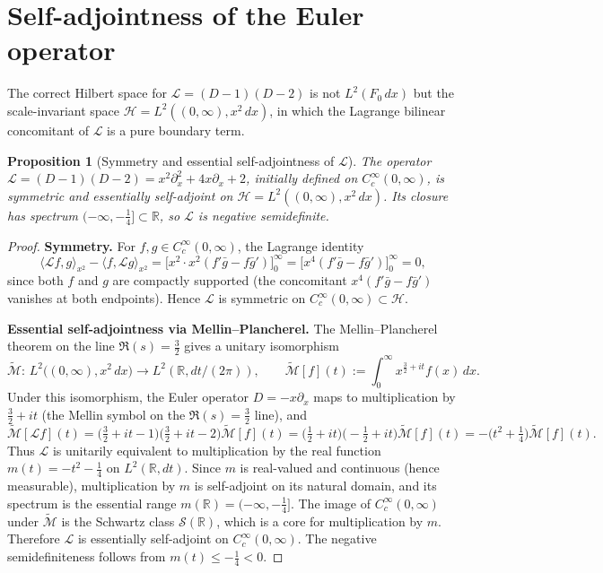 \documentclass[12pt]{article}
\theoremstyle{plain}
\newtheorem{proposition}[theorem]{Proposition}
\theoremstyle{definition}
\newcommand{\R}{\mathbb{R}}
\begin{document}
\section{Self-adjointness of the Euler operator}

The correct Hilbert space for $\mathcal{L}=(D-1)(D-2)$ is not $L^2(F_0\,dx)$
but the scale-invariant space $\mathcal{H}=L^2((0,\infty),x^2\,dx)$, in which
the Lagrange bilinear concomitant of $\mathcal{L}$ is a pure boundary term.

\begin{proposition}[Symmetry and essential self-adjointness of $\mathcal{L}$]
\label{prop:selfadj_L}
The operator $\mathcal{L}=(D-1)(D-2)=x^2\partial_x^2+4x\partial_x+2$,
initially defined on $C_c^\infty(0,\infty)$, is symmetric and essentially
self-adjoint on $\mathcal{H}=L^2((0,\infty),x^2\,dx)$.
Its closure has spectrum $(-\infty,-\tfrac14]\subset\R$, so $\mathcal{L}$
is negative semidefinite.
\end{proposition}

\begin{proof}
\textbf{Symmetry.}
For $f,g\in C_c^\infty(0,\infty)$, the Lagrange identity
\[
  \langle\mathcal{L}f,g\rangle_{x^2}-\langle f,\mathcal{L}g\rangle_{x^2}
  = \bigl[x^2\cdot x^2(f'\bar g-f\bar g')\bigr]_0^\infty
  = \bigl[x^4(f'\bar g-f\bar g')\bigr]_0^\infty = 0,
\]
since both $f$ and $g$ are compactly supported (the concomitant $x^4(f'\bar g-f\bar g')$
vanishes at both endpoints).  Hence $\mathcal{L}$ is symmetric on
$C_c^\infty(0,\infty)\subset\mathcal{H}$.

\textbf{Essential self-adjointness via Mellin--Plancherel.}
The Mellin--Plancherel theorem on the line $\Re(s)=\tfrac32$ gives a unitary
isomorphism
\[
  \widetilde{\mathcal{M}}:\,L^2\!\bigl((0,\infty),x^2\,dx\bigr)\longrightarrow
  L^2(\R,dt/(2\pi)),
  \qquad
  \widetilde{\mathcal{M}}[f](t):=\int_0^\infty x^{\frac32+it}f(x)\,dx.
\]
Under this isomorphism, the Euler operator $D=-x\partial_x$ maps to multiplication
by $\tfrac32+it$ (the Mellin symbol on the $\Re(s)=\tfrac32$ line), and
\[
  \widetilde{\mathcal{M}}[\mathcal{L}f](t)
  = \bigl(\tfrac32+it-1\bigr)\bigl(\tfrac32+it-2\bigr)\widetilde{\mathcal{M}}[f](t)
  = \bigl(\tfrac12+it\bigr)\bigl(-\tfrac12+it\bigr)\widetilde{\mathcal{M}}[f](t)
  = -\bigl(t^2+\tfrac14\bigr)\widetilde{\mathcal{M}}[f](t).
\]
Thus $\mathcal{L}$ is unitarily equivalent to multiplication by the real function
$m(t)=-t^2-\tfrac14$ on $L^2(\R,dt)$.  Since $m$ is real-valued and continuous
(hence measurable), multiplication by $m$ is self-adjoint on its natural domain,
and its spectrum is the essential range $m(\R)=(-\infty,-\tfrac14]$.  The image
of $C_c^\infty(0,\infty)$ under $\widetilde{\mathcal{M}}$ is the Schwartz class
$\mathcal{S}(\R)$, which is a core for multiplication by $m$.  Therefore
$\mathcal{L}$ is essentially self-adjoint on $C_c^\infty(0,\infty)$.  The
negative semidefiniteness follows from $m(t)\le -\tfrac14<0$.
\end{proof}
\end{document}
